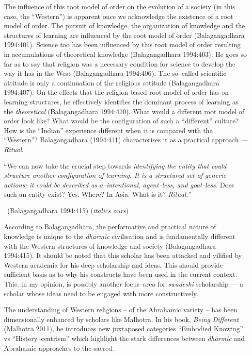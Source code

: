 The influence of this root model of order on the evolution of a society (in this case, the “Western”) is apparent once we acknowledge the existence of a root model of order. The pursuit of knowledge, the organization of knowledge and the structures of learning are influenced by the root model of order (Balagangadhara 1994:401). Science too has been influenced by this root model of order resulting in accumulations of theoretical knowledge (Balagangadhara 1994:403). He goes so far as to say that religion was a necessary condition for science to develop the way it has in the West (Balagangadhara 1994:406). The so–called scientific attitude is only a continuation of the religious attitude (Balagangadhara 1994:407). On the effects that the religion based root model of order has on learning structures, he effectively identifies the dominant process of learning as the \textit{theoretical} (Balagangadhara 1994:410). What would a different root model of order look like? What would be the configuration of such a “different” culture? How is the “Indian” experience different when it is compared with the “Western”? Balagangadhara (1994:411) characterises it as a practical approach — \textit{Ritual}.

\begin{myquote}
“We can now take the crucial step towards \textit{identifying the entity that could structure another configuration of learning. It is a structured set of generic actions; it could be described as a–intentional, agent–less, and goal–less.} Does such an entity exist? Yes. Where? In Asia. What is it? \textit{Ritual.”} 

~\hfill (Balagangadhara 1994:415) (\textit{italics ours})
\end{myquote}

According to Balagangadhara, the performative and practical nature of knowledge is unique to the \textit{dhārmic} civilisation and is fundamentally different with the Western structures of knowledge and society (Balagangadhara 1994:415). It should be noted that this scholar has been attacked and vilified by Western academia for his deep scholarship and ideas. This should provide sufficient basis as to why his constructs have been used in the current context. This, in my opinion, is possibly another focus–area for \textit{swadeshi} scholarship — a scholar whose ideas need to be engaged with more constructively.

The understanding of Western religions – of the Abrahamic variety – has been dimensionally enhanced by scholars like Malhotra. In his book, \textit{Being Different} (Malhotra 2011), he introduces new juxtaposed categories “Embodied Knowing” vs “History–centrism” which highlight the stark differences between \textit{dhārmic} and Abrahamic approaches to the sacred.


